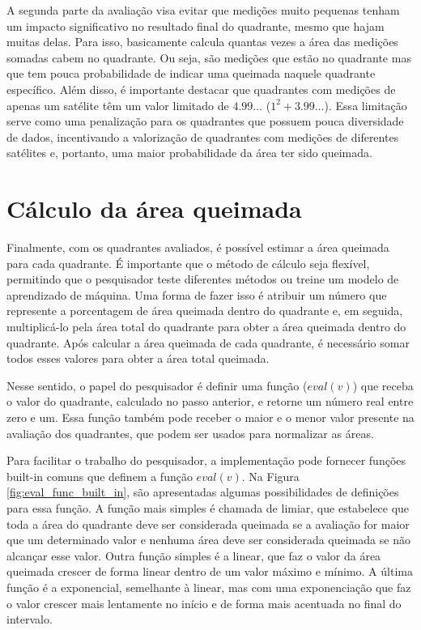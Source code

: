 \documentclass[cic,tc]{iiufrgs}
\begin{document}
A segunda parte da avaliação visa evitar que medições muito pequenas tenham um impacto significativo no resultado final do quadrante, mesmo que hajam muitas delas. 
Para isso, basicamente calcula quantas vezes a área das medições somadas cabem no quadrante. Ou seja, são medições que estão no quadrante mas que tem pouca probabilidade de indicar uma queimada naquele quadrante específico. Além disso, é importante destacar que quadrantes com medições de apenas um satélite têm um valor limitado de $4.99\ldots$ ($1^2 + 3.99\ldots$). Essa limitação serve como uma penalização para os quadrantes que possuem pouca diversidade de dados, incentivando a valorização de quadrantes com medições de diferentes satélites e, portanto, uma maior probabilidade da área ter sido queimada. \par

\section{Cálculo da área queimada}

Finalmente, com os quadrantes avaliados, é possível estimar a área queimada para cada quadrante. É importante que o método de cálculo seja flexível, permitindo que o pesquisador teste diferentes métodos ou treine um modelo de aprendizado de máquina. Uma forma de fazer isso é atribuir um número que represente a porcentagem de área queimada dentro do quadrante e, em seguida, multiplicá-lo pela área total do quadrante para obter a área queimada dentro do quadrante. Após calcular a área queimada de cada quadrante, é necessário somar todos esses valores para obter a área total queimada. \par

Nesse sentido, o papel do pesquisador é definir uma função ($eval(v)$) que receba o valor do quadrante, calculado no passo anterior, e retorne um número real entre zero e um. Essa função também pode receber o maior e o menor valor presente na avaliação dos quadrantes, que podem ser usados para normalizar as áreas. \par

Para facilitar o trabalho do pesquisador, a implementação pode fornecer funções built-in comuns que definem a função $eval(v)$. Na Figura \ref{fig:eval_func_built_in}, são apresentadas algumas possibilidades de definições para essa função. A função mais simples é chamada de limiar, que estabelece que toda a área do quadrante deve ser considerada queimada se a avaliação for maior que um determinado valor e nenhuma área deve ser considerada queimada se não alcançar esse valor. Outra função simples é a linear, que faz o valor da área queimada crescer de forma linear dentro de um valor máximo e mínimo. A última função é a exponencial, semelhante à linear, mas com uma exponenciação que faz o valor crescer mais lentamente no início e de forma mais acentuada no final do intervalo. \par
\end{document}
